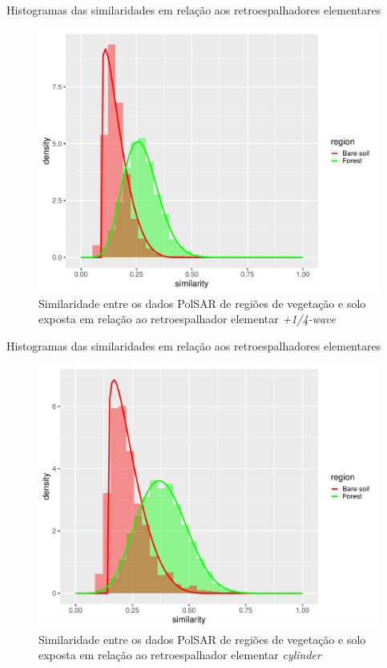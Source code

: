 \documentclass[10pt]{beamer}
\begin{document}
\begin{frame}{Histogramas das similaridades em relação aos retroespalhadores elementares}

\begin{figure}
    \centering
    \includegraphics[width = .6\linewidth]{wvp.pdf}
    \caption{Similaridade entre os dados PolSAR de regiões de vegetação e solo exposta em relação ao retroespalhador elementar \textit{+1/4-wave}}
    \label{fig:wvp}
\end{figure}
    
\end{frame}

\begin{frame}{Histogramas das similaridades em relação aos retroespalhadores elementares}

\begin{figure}
    \centering
    \includegraphics[width = .6\linewidth]{cy.pdf}
    \caption{Similaridade entre os dados PolSAR de regiões de vegetação e solo exposta em relação ao retroespalhador elementar \textit{cylinder}}
    \label{fig:cy}
\end{figure}
    
\end{frame}
\end{document}
